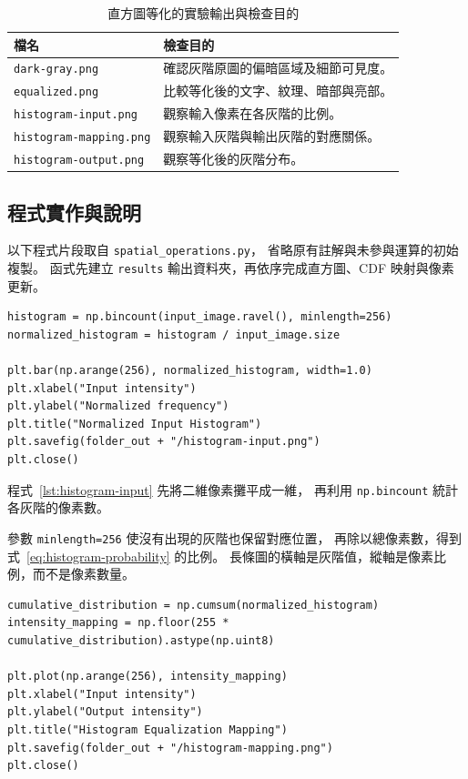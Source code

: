 \begin{table}[H]
  \centering
  \caption{直方圖等化的實驗輸出與檢查目的}
  \label{tab:histogram-files}
  \begin{tabularx}{\textwidth}{@{}lX@{}}
    \toprule
    檔名 & 檢查目的 \\
    \midrule
    \texttt{dark-gray.png} & 確認灰階原圖的偏暗區域及細節可見度。 \\
    \texttt{equalized.png} & 比較等化後的文字、紋理、暗部與亮部。 \\
    \texttt{histogram-input.png} & 觀察輸入像素在各灰階的比例。 \\
    \texttt{histogram-mapping.png} & 觀察輸入灰階與輸出灰階的對應關係。 \\
    \texttt{histogram-output.png} & 觀察等化後的灰階分布。 \\
    \bottomrule
  \end{tabularx}
\end{table}

\subsection{程式實作與說明}

以下程式片段取自 \texttt{spatial\_operations.py}，
省略原有註解與未參與運算的初始複製。
函式先建立 \texttt{results} 輸出資料夾，再依序完成直方圖、CDF 映射與像素更新。

\begin{lstlisting}[caption={計算並繪製正規化輸入直方圖},label={lst:histogram-input}]
histogram = np.bincount(input_image.ravel(), minlength=256)
normalized_histogram = histogram / input_image.size

plt.bar(np.arange(256), normalized_histogram, width=1.0)
plt.xlabel("Input intensity")
plt.ylabel("Normalized frequency")
plt.title("Normalized Input Histogram")
plt.savefig(folder_out + "/histogram-input.png")
plt.close()
\end{lstlisting}

程式~\ref{lst:histogram-input} 先將二維像素攤平成一維，
再利用 \texttt{np.bincount} 統計各灰階的像素數。

參數 \texttt{minlength=256} 使沒有出現的灰階也保留對應位置，
再除以總像素數，得到式~\eqref{eq:histogram-probability} 的比例。
長條圖的橫軸是灰階值，縱軸是像素比例，而不是像素數量。

\begin{lstlisting}[caption={建立並繪製 CDF 強度映射},label={lst:histogram-mapping}]
cumulative_distribution = np.cumsum(normalized_histogram)
intensity_mapping = np.floor(255 * cumulative_distribution).astype(np.uint8)

plt.plot(np.arange(256), intensity_mapping)
plt.xlabel("Input intensity")
plt.ylabel("Output intensity")
plt.title("Histogram Equalization Mapping")
plt.savefig(folder_out + "/histogram-mapping.png")
plt.close()
\end{lstlisting}

